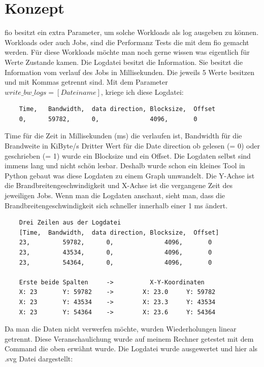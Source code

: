 \documentclass{article}
\begin{document}


\section{Konzept}
fio besitzt ein extra Parameter, um solche Workloads als log ausgeben zu können.
Workloads oder auch Jobs, sind die Performanz Tests die mit dem fio gemacht werden.
Für diese Workloads möchte man noch gerne wissen was eigentlich für Werte Zustande kamen.
Die Logdatei besitzt die Information. Sie besitzt die Information vom verlauf des Jobs in Millisekunden.
Die jeweils 5 Werte besitzen und mit Kommas getrennt sind.
Mit dem Parameter $write\_bw\_logs=[Dateiname]$, kriege ich diese Logdatei: 
\bigskip
\begin{lstlisting}
    Time,	Bandwidth,	data direction, Blocksize,	Offset
    0, 	    59782, 		0,		        4096,		0
\end{lstlisting}
\bigskip
Time für die Zeit in Millisekunden (ms) die verlaufen ist, Bandwidth für die Brandweite in KiByte/s
Dritter Wert für die Date direction ob gelesen (= 0) oder geschrieben (= 1) wurde ein Blocksize
und ein Offset. Die Logdaten selbst sind immens lang und nicht schön lesbar. Deshalb wurde schon ein kleines Tool in Python gebaut 
was diese Logdaten zu einem Graph umwandelt. 
Die Y-Achse ist die Brandbreitengeschwindigkeit und X-Achse ist die vergangene Zeit des jeweiligen Jobs.
Wenn man die Logdaten anschaut, sieht man, dass die Brandbreitengeschwindigkeit sich schneller innerhalb einer 1 ms ändert.
\\
\begin{lstlisting}
    Drei Zeilen aus der Logdatei
    [Time,	Bandwidth,	data direction, Blocksize,	Offset]
    23, 	    59782, 		0,		        4096,		0
    23, 	    43534, 		0,		        4096,		0
    23, 	    54364, 		0,		        4096,		0

    Erste beide Spalten     ->          X-Y-Koordinaten
    X: 23       Y: 59782    ->        X: 23.0     Y: 59782
    X: 23       Y: 43534    ->        X: 23.3     Y: 43534
    X: 23       Y: 54364    ->        X: 23.6     Y: 54364
\end{lstlisting}
\bigskip
Da man die Daten nicht verwerfen möchte, wurden Wiederholungen linear getrennt. 
Diese Veranschaulichung wurde auf meinem Rechner getestet mit dem
Command die oben erwähnt wurde. Die Logdatei wurde ausgewertet und hier als .svg Datei dargestellt:
\end{document}
